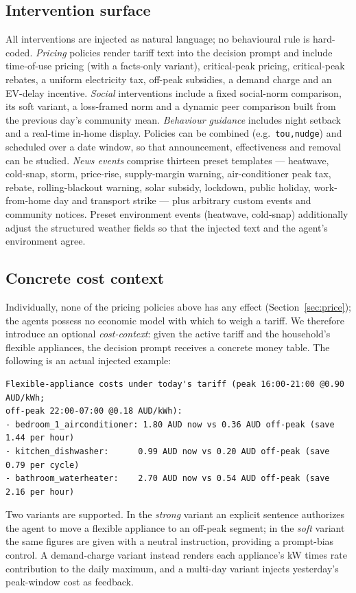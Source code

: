 \documentclass[11pt]{article}
\begin{document}
\subsection{Intervention surface}
All interventions are injected as natural language; no behavioural rule is hard-coded. \emph{Pricing}
policies render tariff text into the decision prompt and include time-of-use pricing (with a facts-only
variant), critical-peak pricing, critical-peak rebates, a uniform electricity tax, off-peak subsidies, a
demand charge and an EV-delay incentive. \emph{Social} interventions include a fixed social-norm
comparison, its soft variant, a loss-framed norm and a dynamic peer comparison built from the previous
day's community mean. \emph{Behaviour guidance} includes night setback and a real-time in-home display.
Policies can be combined (e.g.\ \texttt{tou,nudge}) and scheduled over a date window, so that
announcement, effectiveness and removal can be studied. \emph{News events} comprise thirteen preset
templates --- heatwave, cold-snap, storm, price-rise, supply-margin warning, air-conditioner peak tax,
rebate, rolling-blackout warning, solar subsidy, lockdown, public holiday, work-from-home day and
transport strike --- plus arbitrary custom events and community notices. Preset environment events
(heatwave, cold-snap) additionally adjust the structured weather fields so that the injected text and the
agent's environment agree.

\subsection{Concrete cost context}
Individually, none of the pricing policies above has any effect (Section~\ref{sec:price}); the agents
possess no economic model with which to weigh a tariff. We therefore introduce an optional
\emph{cost-context}: given the active tariff and the household's flexible appliances, the decision prompt
receives a concrete money table. The following is an actual injected example:
\begin{verbatim}
Flexible-appliance costs under today's tariff (peak 16:00-21:00 @0.90 AUD/kWh;
off-peak 22:00-07:00 @0.18 AUD/kWh):
- bedroom_1_airconditioner: 1.80 AUD now vs 0.36 AUD off-peak (save 1.44 per hour)
- kitchen_dishwasher:      0.99 AUD now vs 0.20 AUD off-peak (save 0.79 per cycle)
- bathroom_waterheater:    2.70 AUD now vs 0.54 AUD off-peak (save 2.16 per hour)
\end{verbatim}
Two variants are supported. In the \emph{strong} variant an explicit sentence authorizes the agent to
move a flexible appliance to an off-peak segment; in the \emph{soft} variant the same figures are given
with a neutral instruction, providing a prompt-bias control. A demand-charge variant instead renders each
appliance's kW times rate contribution to the daily maximum, and a multi-day variant injects yesterday's
peak-window cost as feedback.
\end{document}
